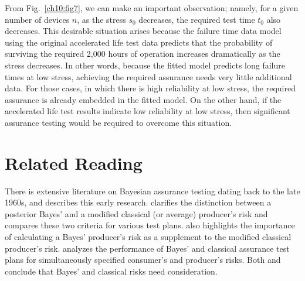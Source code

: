 \documentclass {book}
\begin{document}
From Fig.~\ref{ch10:fig7}, we can make an important observation;
namely, for a given number of devices $n$, as the stress $s_0$
decreases, the required test time $t_{0}$ also decreases. This
desirable situation arises because the failure time data model
using the original accelerated life test data predicts that the
probability of surviving the required 2,000 hours of operation
increases dramatically as the stress decreases. In other words,
because the fitted model predicts long failure times at low
stress, achieving the required assurance needs very little
additional data. For those cases, in which there is high
reliability at low stress, the required assurance is already
embedded in the fitted model. On the other hand, if the
accelerated life test results indicate low reliability at low
stress, then significant assurance testing would be required to
overcome this situation.

\section{Related Reading}\label{ch10:sec5}
There is extensive literature on Bayesian assurance testing dating
back to the late 1960s, and \citet{MW82} describes this early
research. \citet{B86}  clarifies the distinction between a
posterior Bayes' and a modified classical (or average) producer's
risk and compares these two criteria for various test plans.
 \citet{B86} also
highlights the importance of calculating a Bayes' producer's risk
as a supplement to the modified classical producer's
risk. \citet{SB92}
analyzes the performance of Bayes' and classical assurance test
plans for simultaneously specified consumer's and producer's
risks. Both \citet{B86} and \citet{SB92} conclude that Bayes' and
classical risks need consideration. 
\end{document}
